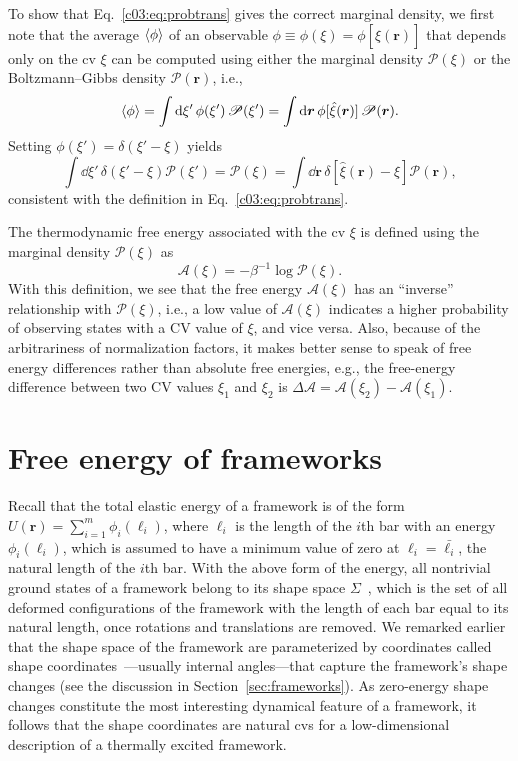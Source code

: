 To show that Eq.~\eqref{c03:eq:probtrans} gives the correct marginal density, we first note that the average $\mathinner{\langle{\phi}\rangle}$ of an observable $\phi \equiv \phi(\xi) = \phi[\hat{\xi}(\bm{r})]$ that depends only on the \ac{cv} $\xi$ can be computed using either the marginal density $\mathscr{P}(\xi)$ or the Boltzmann--Gibbs density $\mathscr{P}(\bm{r})$, i.e.,
%
\begin{equation}
  \mathinner{\langle{\phi}\rangle} = \int \mathrm{d}{\xi'}\, \phi(\xi')\,\mathscr{P}(\xi') = \int \mathrm{d}{\bm{r}}\, \phi[\hat{\xi}(\bm{r})]\,\mathscr{P}(\bm{r}).
\end{equation}
%
Setting $\phi(\xi') = \delta(\xi' - \xi)$ yields
%
\begin{equation}
  \int \dd{\xi'}\, \delta(\xi' - \xi) \mathscr{P}(\xi') = \mathscr{P}(\xi) = \int \dd{\bm{r}}\, \delta[\hat{\xi}(\bm{r}) - \xi] \mathscr{P}(\bm{r}),
\end{equation}
%
consistent with the definition in Eq.~\eqref{c03:eq:probtrans}.

The thermodynamic free energy associated with the \ac{cv} $\xi$ is defined using the marginal density $\mathscr{P}(\xi)$ as~\cite{lelievre2010}
%
\begin{equation}
  \boxed{\mathscr{A}(\xi) = -\beta^{-1}\log{\mathscr{P}(\xi)}.}
  \label{eq:free_energy}
\end{equation}
%
With this definition, we see that the free energy $\mathscr{A}(\xi)$ has an ``inverse'' relationship with $\mathscr{P}(\xi)$, i.e., a low value of $\mathscr{A}(\xi)$ indicates a higher probability of observing states with a CV value of $\xi$, and vice versa.
Also, because of the arbitrariness of normalization factors, it makes better sense to speak of free energy differences rather than absolute free energies, e.g., the free-energy difference between two CV values $\xi_{1}$ and $\xi_{2}$ is $\Delta \mathscr{A} = \mathscr{A}(\xi_{2}) - \mathscr{A}(\xi_{1})$.

\section{Free energy of frameworks}

Recall that the total elastic energy of a framework is of the form $U(\bm{r}) = \sum_{i=1}^{m} \phi_{i}(\ell_{i})$, where $\ell_{i}$ is the length of the $i$th bar with an energy $\phi_i(\ell_{i})$, which is assumed to have a minimum value of zero at $\ell_{i} = \bar{\ell_{i}}$, the natural length of the $i$th bar.
%
With the above form of the energy, all nontrivial ground states of a framework belong to its shape space $\Sigma$~\cite{kendall1989,mezey1993,kendall1999}, which is the set of all deformed configurations of the framework with the length of each bar equal to its natural length, once rotations and translations are removed.
We remarked earlier that the shape space of the framework are parameterized by coordinates called shape coordinates~\cite{littlejohn1995}---usually internal angles---that capture the framework's shape changes (see the discussion in Section~\ref{sec:frameworks}).
As zero-energy shape changes constitute the most interesting dynamical feature of a framework, it follows that the shape coordinates are natural \ac{cv}s for a low-dimensional description of a thermally excited framework.

